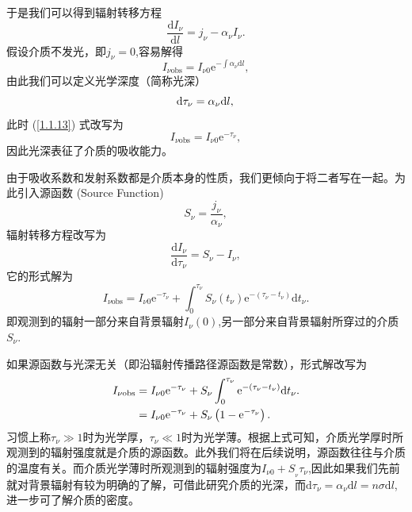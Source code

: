 \documentclass[../天体物理基础.tex]{subfiles}
\begin{document}
于是我们可以得到辐射转移方程
\begin{equation}
\frac{\mathrm{d}I_{\nu}}{\mathrm{d}l}=j_{\nu}-\alpha_{\nu}I_{\nu}.
\end{equation}
假设介质不发光，即$j_{\nu}=0$,容易解得
\begin{equation}
I_{\nu\text{obs}}=I_{\nu0}\mathrm{e}^{-\int\alpha_{\nu}\mathrm{d}l},\label{1.1.13}
\end{equation}
由此我们可以定义光学深度（简称光深）
\begin{equation}
\mathrm{d}\tau_\nu=\alpha_{\nu}\mathrm{d}l,\\
\end{equation}
此时 (\ref{1.1.13}) 式改写为
\begin{equation}
I_{\nu\text{obs}}=I_{\nu0}\mathrm{e}^{-\tau_{\nu}},\label{1.1.15}
\end{equation}
因此光深表征了介质的吸收能力。

由于吸收系数和发射系数都是介质本身的性质，我们更倾向于将二者写在一起。为此引入源函数 (Source Function)
\begin{equation}
S_{\nu}=\frac{j_{\nu}}{\alpha_{\nu}},
\end{equation}
辐射转移方程改写为
\begin{equation}
\frac{\mathrm{d}I_{\nu}}{\mathrm{d}\tau_{\nu}}=S_{\nu}-I_{\nu},
\end{equation}
它的形式解为
\begin{equation}
I_{\nu\text{obs}}=I_{\nu0}\mathrm{e}^{-\tau_{\nu}}+\int^{\tau_{\nu}}_{0}S_{\nu}\left(t_{\nu}\right)\mathrm{e}^{-\left(\tau_{\nu}-t_{\nu}\right)}\mathrm{d}t_{\nu}.
\end{equation}
即观测到的辐射一部分来自背景辐射$I_{\nu}\left(0\right)$,另一部分来自背景辐射所穿过的介质$S_{\nu}$.

如果源函数与光深无关（即沿辐射传播路径源函数是常数），形式解改写为
\begin{align}
I_{\nu\text{obs}}&=I_{\nu0}\mathrm{e}^{-\tau_{\nu}}+S_{\nu}\int^{\tau_{\nu}}_{0}\mathrm{e}^{-\left(\tau_{\nu}-t_{\nu}\right)}\mathrm{d}t_{\nu}.\notag\\
&=I_{\nu0}\mathrm{e}^{-\tau_{\nu}}+S_{\nu}\left(1-\mathrm{e}^{-\tau_{\nu}}\right).
\end{align}
习惯上称$\tau_{\nu}\gg1$时为光学厚，$\tau_{\nu}\ll1$时为光学薄。根据上式可知，介质光学厚时所观测到的辐射强度就是介质的源函数。此外我们将在后续说明，源函数往往与介质的温度有关。而介质光学薄时所观测到的辐射强度为$I_{\nu0}+S_{_{\nu}}\tau_{\nu}$,因此如果我们先前就对背景辐射有较为明确的了解，可借此研究介质的光深，而$\mathrm{d}\tau_{\nu}=\alpha_{\nu}\mathrm{d}l=n\sigma\mathrm{d}l$,进一步可了解介质的密度。
\end{document}
